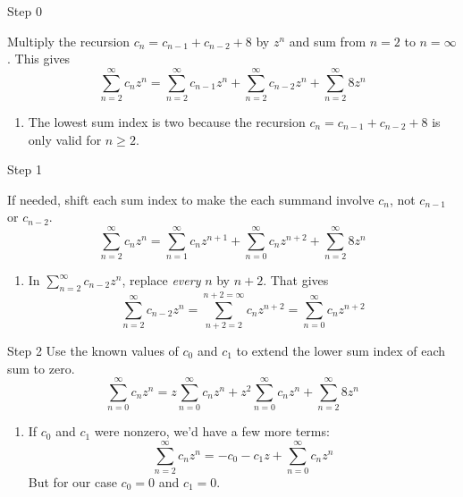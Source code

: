 \documentclass[portrait,fleqn,12pt]{beamer}
\newenvironment{handlist}
   {\begin{enumerate}[\faHandPointRight]
       \addtolength{\itemsep}{0.0\itemsep}}
     {\end{enumerate}}
\begin{document}
\begin{frame}{Step 0}

Multiply the recursion $c_n = c_{n-1} + c_{n-2}+ 8$ by $z^n$ and sum from $n=2$ to $n=\infty$.  This gives
\begin{equation}
  \sum_{n=2}^\infty c_{n} z^n  =  \sum_{n=2}^\infty c_{n-1} z^n +  \sum_{n=2}^\infty c_{n-2} z^n +  \sum_{n=2}^\infty 8 z^n
\end{equation}
\begin{handlist}
\item The lowest sum index is two because the recursion  $c_n = c_{n-1} + c_{n-2}+ 8$ is only valid for $n \geq 2$.
\end{handlist}
\end{frame}
\begin{frame}{Step 1}

If needed, shift each sum index to make the each summand involve $c_n$, not $c_{n-1}$ or $c_{n-2}$.
\begin{equation}
  \sum_{n=2}^\infty c_{n} z^n  =  \sum_{n=1}^\infty c_{n} z^{n+1} +  \sum_{n=0}^\infty c_{n} z^{n+2} +  \sum_{n=2}^\infty 8 z^n
\end{equation}
\begin{handlist}
\item In $ \sum_{n=2}^\infty c_{n-2} z^n$, replace \emph{every} $n$ by $n+2$. That gives
\begin{equation}
  \sum_{n=2}^\infty c_{n-2} z^n =  \sum_{n+2=2}^{n+2 = \infty} c_{n} z^{n+2} = \sum_{n=0}^{\infty} c_{n} z^{n+2}
\end{equation}
\end{handlist}
\end{frame}

\begin{frame}{Step 2}
Use the known values of $c_0$ and $c_1$ to extend the lower sum index of each sum to zero.
\begin{equation}
  \sum_{n=0}^\infty c_{n} z^n  =  z \sum_{n=0}^\infty c_{n} z^{n} +  z^2 \sum_{n=0}^\infty c_{n} z^{n} +  \sum_{n=2}^\infty 8 z^n
\end{equation}
\begin{handlist}
\item If $c_0$ and $c_1$ were nonzero, we'd have a few more terms:
\begin{equation}
  \sum_{n=2}^\infty c_{n} z^n = -c_0 - c_1 z + \sum_{n=0}^\infty c_{n} z^n
\end{equation}
But for our case $c_0 = 0$ and $c_1 = 0$.
\end{handlist}
\end{frame}
\end{document}
